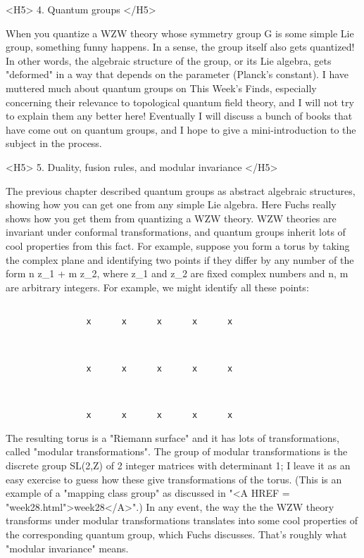 <H5> 4.  Quantum groups </H5>

When you quantize a WZW theory whose symmetry group G is some simple
Lie group, something funny happens.  In a sense, the group itself
also gets quantized!  In other words, the algebraic structure of
the group, or its Lie algebra, gets "deformed" in a way that depends on 
the parameter \hbar  (Planck's constant).  I have muttered much about
quantum groups on This Week's Finds, especially concerning their
relevance to topological quantum field theory, and I will not try to
explain them any better here!  Eventually I will discuss a bunch of
books that have come out on quantum groups, and I hope to give
a mini-introduction to the subject in the process.

<H5> 5.  Duality, fusion rules, and modular invariance </H5>

The previous chapter described quantum groups as abstract algebraic
structures, showing how you can get one from any simple Lie algebra.
Here Fuchs really shows how you get them from quantizing a WZW theory.
WZW theories are invariant under conformal transformations, and
quantum groups inherit lots of cool properties from this fact.  For
example, suppose you form a torus by taking the complex plane
and identifying two points if they differ by any number of the form
n z_{1} + m z_{2}, where z_{1} and z_{2} 
are fixed complex numbers and n, m are arbitrary integers.  For example, 
we might identify all these points:



\begin{verbatim}

                x      x      x      x      x



                x      x      x      x      x



                x      x      x      x      x

\end{verbatim}
    

The resulting torus is a "Riemann surface" and it has lots of
transformations, called "modular transformations".  The group of
modular transformations is the discrete group SL(2,Z) of 2 integer
matrices with determinant 1; I leave it as an easy exercise to guess
how these give transformations of the torus.  (This is an example of a
"mapping class group" as discussed in "<A HREF =
"week28.html">week28</A>".)  In any event, the way the the WZW theory
transforms under modular transformations translates into some cool
properties of the corresponding quantum group, which Fuchs discusses.
That's roughly what "modular invariance" means.

